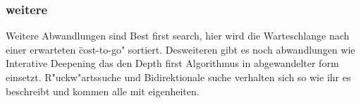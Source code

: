 \subsubsection{weitere}
Weitere Abwandlungen sind Best first search, hier wird die Warteschlange nach einer erwarteten \"cost-to-go" sortiert. 
Desweiteren gibt es noch abwandlungen wie Interative Deepening das den Depth first Algorithmus in abgewandelter form einsetzt. 
R"uckw"artssuche und Bidirektionale suche verhalten sich so wie ihr es beschreibt und kommen alle mit eigenheiten. 

 
